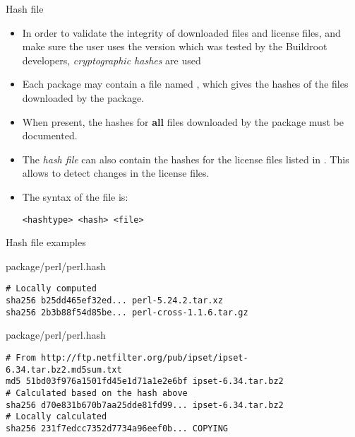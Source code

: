 \begin{frame}[fragile]{Hash file}

  \begin{itemize}

  \item In order to validate the integrity of downloaded files and
    license files, and make sure the user uses the version which was
    tested by the Buildroot developers, {\em cryptographic hashes} are
    used

  \item Each package may contain a file named ,
    which gives the hashes of the files downloaded by the package.

  \item When present, the hashes for {\bf all} files downloaded by the
    package must be documented.

  \item The {\em hash file} can also contain the hashes for the
    license files listed in . This allows to
    detect changes in the license files.

  \item The syntax of the file is:
    \begin{block}{}
      {\tiny
\begin{verbatim}
<hashtype> <hash> <file>
\end{verbatim}
      }
    \end{block}
  \end{itemize}
\end{frame}

\begin{frame}[fragile]{Hash file examples}
  \begin{block}{package/perl/perl.hash}
    {\tiny
\begin{verbatim}
# Locally computed
sha256 b25dd465ef32ed... perl-5.24.2.tar.xz
sha256 2b3b88f54d85be... perl-cross-1.1.6.tar.gz
\end{verbatim}
    }
  \end{block}

  \begin{block}{package/perl/perl.hash}
    {\tiny
\begin{verbatim}
# From http://ftp.netfilter.org/pub/ipset/ipset-6.34.tar.bz2.md5sum.txt
md5 51bd03f976a1501fd45e1d71a1e2e6bf ipset-6.34.tar.bz2
# Calculated based on the hash above
sha256 d70e831b670b7aa25dde81fd99... ipset-6.34.tar.bz2
# Locally calculated
sha256 231f7edcc7352d7734a96eef0b... COPYING
\end{verbatim}
    }
  \end{block}
\end{frame}

